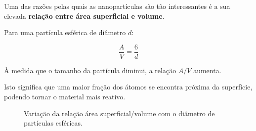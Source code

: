 \documentclass[11pt,a4paper]{article}
\begin{document}
	
	\begin{stem}
		
		Uma das razões pelas quais as nanopartículas são tão interessantes é a sua
		elevada \textbf{relação entre área superficial e volume}.
		
		Para uma partícula esférica de diâmetro \(d\):
		
		\[
		\frac{A}{V}=\frac{6}{d}
		\]
		
		À medida que o tamanho da partícula diminui, a relação \(A/V\) aumenta.
		
		Isto significa que uma maior fração dos átomos se encontra próxima da
		superfície, podendo tornar o material mais reativo.
		
	\end{stem}
	
	
	\begin{figure}[H]
		\centering
		
		
		\caption{Variação da relação área superficial/volume com o diâmetro de partículas esféricas.}
	\end{figure}
	
	
\end{document}
